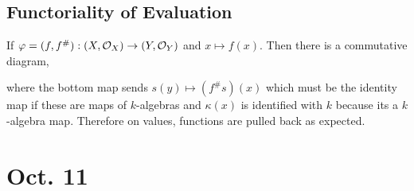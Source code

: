 \documentclass[12pt]{article}
\begin{document}
\subsection{Functoriality of Evaluation} 

If $\varphi = (f, f^\#) : (X, \mathcal{O}_{X}) \to (Y, \mathcal{O}_{Y})$ and $x \mapsto f(x)$. Then there is a commutative diagram,
\begin{center}
\end{center}
where the bottom map sends $s(y) \mapsto (f^\# s)(x)$ which must be the identity map if these are maps of $k$-algebras and $\kappa(x)$ is identified with $k$ because its a $k$-algebra map. Therefore on values, functions are pulled back as expected.


\section{Oct. 11}
\end{document}
